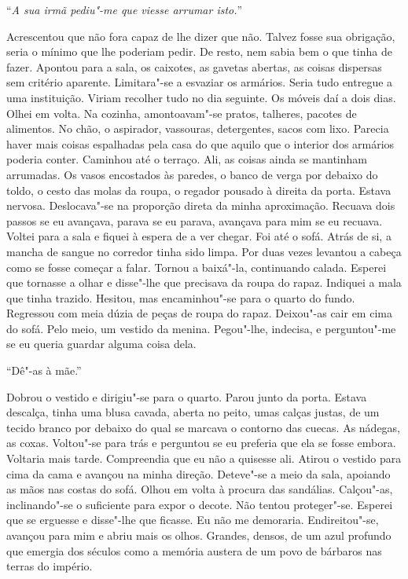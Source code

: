 ``\emph{A sua irmã pediu"-me que viesse arrumar isto.}''

Acrescentou que não fora capaz de lhe dizer que não. Talvez fosse sua
obrigação, seria o mínimo que lhe poderiam pedir. De resto, nem sabia
bem o que tinha de fazer. Apontou para a sala, os caixotes, as gavetas
abertas, as coisas dispersas sem critério aparente. Limitara"-se a
esvaziar os armários. Seria tudo entregue a uma instituição. Viriam
recolher tudo no dia seguinte. Os móveis daí a dois dias. Olhei em
volta. Na cozinha, amontoavam"-se pratos, talheres, pacotes de
alimentos. No chão, o aspirador, vassouras, detergentes, sacos com lixo.
Parecia haver mais coisas espalhadas pela casa do que aquilo que o
interior dos armários poderia conter. Caminhou até o terraço. Ali, as
coisas ainda se mantinham arrumadas. Os vasos encostados às paredes, o
banco de verga por debaixo do toldo, o cesto das molas da roupa, o
regador pousado à direita da porta. Estava nervosa. Deslocava"-se na
proporção direta da minha aproximação. Recuava dois passos se eu
avançava, parava se eu parava, avançava para mim se eu recuava. Voltei
para a sala e fiquei à espera de a ver chegar. Foi até o sofá. Atrás de
si, a mancha de sangue no corredor tinha sido limpa. Por duas vezes
levantou a cabeça como se fosse começar a falar. Tornou a baixá"-la,
continuando calada. Esperei que tornasse a olhar e disse"-lhe que
precisava da roupa do rapaz. Indiquei a mala que tinha trazido. Hesitou,
mas encaminhou"-se para o quarto do fundo. Regressou com meia dúzia de
peças de roupa do rapaz. Deixou"-as cair em cima do sofá. Pelo meio, um
vestido da menina. Pegou"-lhe, indecisa, e perguntou"-me se eu queria
guardar alguma coisa dela.

``Dê"-as à mãe.''

Dobrou o vestido e dirigiu"-se para o quarto. Parou junto da porta.
Estava descalça, tinha uma blusa cavada, aberta no peito, umas calças
justas, de um tecido branco por debaixo do qual se marcava o contorno
das cuecas. As nádegas, as coxas. Voltou"-se para trás e perguntou se eu
preferia que ela se fosse embora. Voltaria mais tarde. Compreendia que
eu não a quisesse ali. Atirou o vestido para cima da cama e avançou na
minha direção. Deteve"-se a meio da sala, apoiando as mãos nas costas
do sofá. Olhou em volta à procura das sandálias. Calçou"-as,
inclinando"-se o suficiente para expor o decote. Não tentou
proteger"-se. Esperei que se erguesse e disse"-lhe que ficasse. Eu não
me demoraria. Endireitou"-se, avançou para mim e abriu mais os olhos.
Grandes, densos, de um azul profundo que emergia dos séculos como a
memória austera de um povo de bárbaros nas terras do império.

